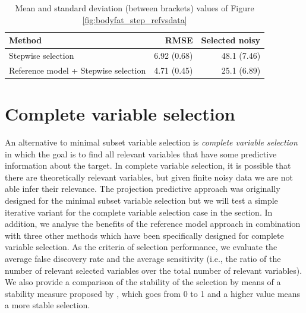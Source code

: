 \documentclass[a4]{article}
\theoremstyle{definition}
\begin{document}
\begin{table}[tp]
\footnotesize
\centering
\begin{tabular}{l|r|r}
Method & RMSE & Selected noisy \\ 
  \hline
Stepwise selection & 6.92 (0.68) & 48.1 (7.46)    \\
Reference model + Stepwise selection & 4.71 (0.45) & 25.1 (6.89)   \\
\end{tabular}
\caption{Mean and standard deviation (between brackets) values of Figure \ref{fig:bodyfat_step_refvsdata}}
\label{tab:step_refvsdata}
\end{table}

\section{Complete variable selection}\label{comparison-complete-subset}
\label{complete-selection}

An alternative to minimal subset variable selection is \emph{complete
  variable selection} in which the goal is to find all relevant
variables that have some predictive information about the target. In
complete variable selection, it is possible that there are theoretically
relevant variables, but given finite noisy data we are not able infer their relevance.
The projection predictive approach was originally designed for the minimal subset
variable selection but we will test a simple iterative variant for the complete
variable selection case in the section.
 In addition, we analyse the benefits of the reference
model approach in combination with three other
methods which have been specifically designed for complete variable selection. 
As the criteria of selection performance, we evaluate the average false
discovery rate and the average
sensitivity (i.e., the ratio of the number of relevant selected
variables over the total number of relevant variables). We also provide
a comparison of the stability of the selection by means of a stability
measure proposed by \citet{paper:stability}, which goes from 0 to 1 and a higher value 
means a more stable selection. 

\end{document}
